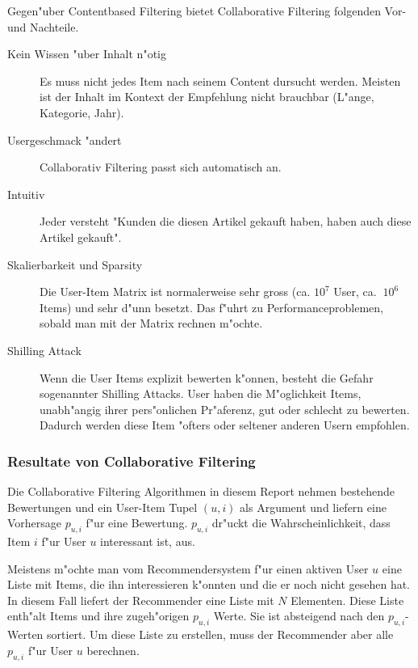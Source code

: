 \documentclass[a4paper, 12pt]{article}
\begin{document}
Gegen"uber Contentbased Filtering bietet Collaborative Filtering folgenden Vor- und Nachteile.
\begin{description}
\item[Vorteile]
\item
\begin{description}
\item[Kein Wissen "uber Inhalt n"otig] Es muss nicht jedes Item nach seinem Content dursucht werden. Meisten ist der Inhalt im Kontext der Empfehlung nicht brauchbar (L"ange, Kategorie, Jahr).
\item[Usergeschmack "andert] Collaborativ Filtering passt sich automatisch an.
\item[Intuitiv] Jeder versteht "Kunden die diesen Artikel gekauft haben, haben auch diese Artikel gekauft".
\end{description}
\item[Nachteile]
\item
\begin{description}
\item[Skalierbarkeit und Sparsity] Die User-Item Matrix ist normalerweise sehr gross (ca. $10^{7}$ User, ca. $~10^6$ Items) und sehr d"unn besetzt. Das f"uhrt zu Performanceproblemen, sobald man mit der Matrix rechnen m"ochte.
\item[Shilling Attack] Wenn die User Items explizit bewerten k"onnen, besteht die Gefahr sogenannter Shilling Attacks. User haben die M"oglichkeit Items, unabh"angig ihrer pers"onlichen Pr"aferenz, gut oder schlecht zu bewerten. Dadurch werden diese Item "ofters oder seltener anderen Usern empfohlen.
\end{description}
\end{description}

\subsubsection{Resultate von Collaborative Filtering}
\label{sec:output}

Die Collaborative Filtering Algorithmen in diesem Report nehmen bestehende Bewertungen und ein User-Item Tupel $(u,i)$ als Argument und liefern eine Vorhersage $p_{u,i}$ f"ur eine Bewertung.  $p_{u,i}$ dr"uckt die Wahrscheinlichkeit, dass Item $i$ f"ur User $u$ interessant ist, aus. 

Meistens m"ochte man vom Recommendersystem f"ur einen aktiven User $u$ eine Liste mit Items, die ihn interessieren k"onnten und die er noch nicht gesehen hat. In diesem Fall liefert der Recommender eine Liste mit $N$ Elementen. Diese Liste enth"alt Items und ihre zugeh"origen $p_{u,i}$ Werte. Sie ist absteigend nach den $p_{u,i}$-Werten sortiert. Um diese Liste zu erstellen, muss der Recommender aber alle $p_{u,i}$ f"ur User $u$ berechnen.
\end{document}
